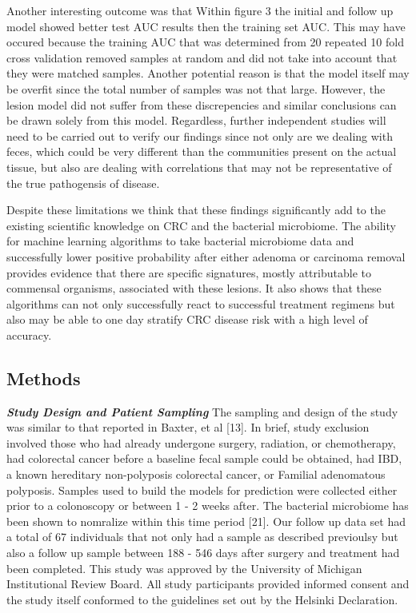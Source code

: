\documentclass[12pt,]{article}
\begin{document}
Another interesting outcome was that Within figure 3 the initial and
follow up model showed better test AUC results then the training set
AUC. This may have occured because the training AUC that was determined
from 20 repeated 10 fold cross validation removed samples at random and
did not take into account that they were matched samples. Another
potential reason is that the model itself may be overfit since the total
number of samples was not that large. However, the lesion model did not
suffer from these discrepencies and similar conclusions can be drawn
solely from this model. Regardless, further independent studies will
need to be carried out to verify our findings since not only are we
dealing with feces, which could be very different than the communities
present on the actual tissue, but also are dealing with correlations
that may not be representative of the true pathogensis of disease.

Despite these limitations we think that these findings significantly add
to the existing scientific knowledge on CRC and the bacterial
microbiome. The ability for machine learning algorithms to take
bacterial microbiome data and successfully lower positive probability
after either adenoma or carcinoma removal provides evidence that there
are specific signatures, mostly attributable to commensal organisms,
associated with these lesions. It also shows that these algorithms can
not only successfully react to successful treatment regimens but also
may be able to one day stratify CRC disease risk with a high level of
accuracy.

\newpage

\subsection{Methods}\label{methods}

\textbf{\emph{Study Design and Patient Sampling}} The sampling and
design of the study was similar to that reported in Baxter, et al
{[}13{]}. In brief, study exclusion involved those who had already
undergone surgery, radiation, or chemotherapy, had colorectal cancer
before a baseline fecal sample could be obtained, had IBD, a known
hereditary non-polyposis colorectal cancer, or Familial adenomatous
polyposis. Samples used to build the models for prediction were
collected either prior to a colonoscopy or between 1 - 2 weeks after.
The bacterial microbiome has been shown to nomralize within this time
period {[}21{]}. Our follow up data set had a total of 67 individuals
that not only had a sample as described previoulsy but also a follow up
sample between 188 - 546 days after surgery and treatment had been
completed. This study was approved by the University of Michigan
Institutional Review Board. All study participants provided informed
consent and the study itself conformed to the guidelines set out by the
Helsinki Declaration.
\end{document}
